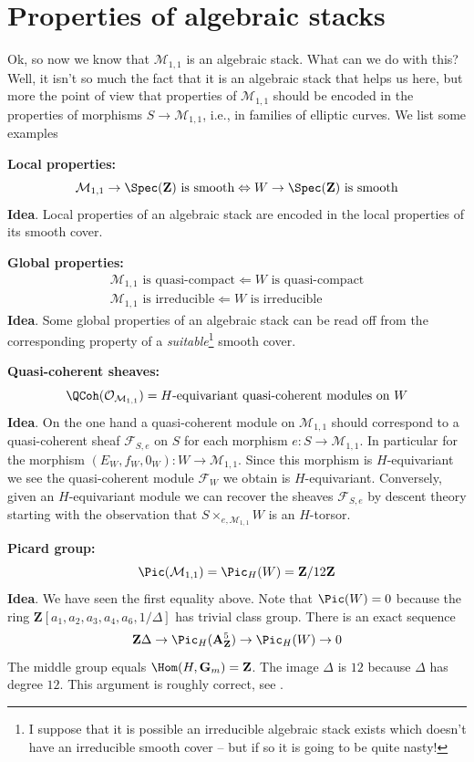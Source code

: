 \section{Properties of algebraic stacks}
\label{stacks-introduction-section-properties}
Ok, so now we know that $\mathcal{M}_{1, 1}$ is an algebraic
stack. What can we do with this? Well, it isn't so much the fact that it
is an algebraic stack that helps us here, but more the point of view that
properties of $\mathcal{M}_{1, 1}$ should be encoded in the properties
of morphisms $S \to \mathcal{M}_{1, 1}$, i.e., in families of elliptic
curves. We list some examples

\medskip\noindent
{\bf Local properties:}
$$
\mathcal{M}_{1, 1} \to \Spec(\mathbf{Z})\text{ is smooth}
\Leftrightarrow
W \to \Spec(\mathbf{Z})\text{ is smooth}
$$
{\bf Idea}. Local properties of an algebraic stack are encoded in the local
properties of its smooth cover.

\medskip\noindent
{\bf Global properties:}
$$
\begin{matrix}
\mathcal{M}_{1, 1}\text{ is quasi-compact} \Leftarrow W\text{ is quasi-compact}
\\
\mathcal{M}_{1, 1}\text{ is irreducible} \Leftarrow W\text{ is irreducible}
\end{matrix}
$$
{\bf Idea}. Some global properties of an algebraic stack can be read off
from the corresponding property of a {\it suitable}\footnote{I suppose that
it is possible an irreducible algebraic stack exists which doesn't have an
irreducible smooth cover -- but if so it is going to be quite nasty!}
smooth cover.

\medskip\noindent
{\bf Quasi-coherent sheaves:}
$$
\QCoh(\mathcal{O}_{\mathcal{M}_{1, 1}}) =
H\text{-equivariant quasi-coherent modules on }W
$$
{\bf Idea}. On the one hand a quasi-coherent module on $\mathcal{M}_{1, 1}$
should correspond to a quasi-coherent sheaf $\mathcal{F}_{S, e}$ on $S$
for each morphism $e : S \to \mathcal{M}_{1, 1}$. In particular for the
morphism $(E_W, f_W, 0_W) :  W \to \mathcal{M}_{1, 1}$. Since this morphism is
$H$-equivariant we see the quasi-coherent module $\mathcal{F}_W$ we obtain is
$H$-equivariant. Conversely, given an $H$-equivariant module we can recover
the  sheaves $\mathcal{F}_{S, e}$ by descent theory starting with the
observation that $S \times_{e, \mathcal{M}_{1, 1}} W$ is an $H$-torsor.

\medskip\noindent
{\bf Picard group:}
$$
\Pic(\mathcal{M}_{1, 1}) = \Pic_H(W) = \mathbf{Z}/12\mathbf{Z}
$$
{\bf Idea}. We have seen the first equality above. Note that
$\Pic(W) = 0$ because the ring
$\mathbf{Z}[a_1, a_2, a_3, a_4, a_6, 1/\Delta]$
has trivial class group.
There is an exact sequence
$$
\mathbf{Z}\Delta \to
\Pic_H(\mathbf{A}^5_{\mathbf{Z}}) \to
\Pic_H(W) \to 0
$$
The middle group equals $\Hom(H, \mathbf{G}_m) = \mathbf{Z}$.
The image $\Delta$ is $12$ because $\Delta$ has degree $12$.
This argument is roughly correct, see \cite{PicM11}.

